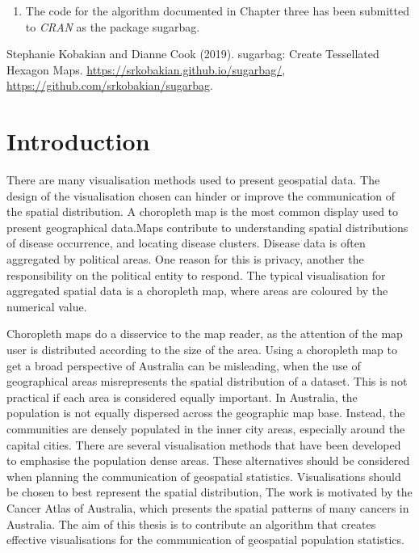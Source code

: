 \documentclass{monashthesis}
\begin{document}
\begin{enumerate}
\def\labelenumi{\arabic{enumi}.}
\setcounter{enumi}{3}
\tightlist
\item
  The code for the algorithm documented in Chapter three has been submitted to \emph{CRAN} as the package sugarbag.
\end{enumerate}

Stephanie Kobakian and Dianne Cook (2019). sugarbag: Create Tessellated
Hexagon Maps. \url{https://srkobakian.github.io/sugarbag/},
\url{https://github.com/srkobakian/sugarbag}.

\clearpage{}\setcounter{page}{0}

\hypertarget{ch:intro}{%
\chapter{Introduction}\label{ch:intro}}

There are many visualisation methods used to present geospatial data. The design of the visualisation chosen can hinder or improve the communication of the spatial distribution. A choropleth map is the most common display used to present geographical data.Maps contribute to understanding spatial distributions of disease occurrence, and locating disease clusters. Disease data is often aggregated by political areas. One reason for this is privacy, another the responsibility on the political entity to respond. The typical visualisation for aggregated spatial data is a choropleth map, where areas are coloured by the numerical value.

Choropleth maps do a disservice to the map reader, as the attention of the map user is distributed according to the size of the area. Using a choropleth map to get a broad perspective of Australia can be misleading, when the use of geographical areas misrepresents the spatial distribution of a dataset. This is not practical if each area is considered equally important. In Australia, the population is not equally dispersed across the geographic map base.
Instead, the communities are densely populated in the inner city areas, especially around the capital cities. There are several visualisation methods that have been developed to emphasise the population dense areas. These alternatives should be considered when planning the communication of geospatial statistics. Visualisations should be chosen to best represent the spatial distribution, The work is motivated by the Cancer Atlas of Australia,
which presents the spatial patterns of many cancers in Australia. The aim of this thesis is to contribute an algorithm that creates effective visualisations for the communication of geospatial population statistics.
\end{document}
